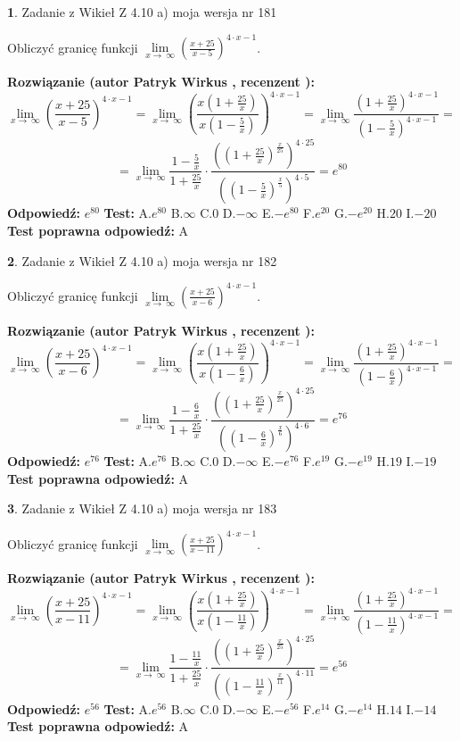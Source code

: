 \documentclass[12pt, a4paper]{article}
\theoremstyle{definition} %
\newtheorem{zad}{}
\newcommand{\zadStart}[1]{\begin{zad}#1\newline}
\newcommand{\zadStop}{\end{zad}}
\newcommand{\rozwStart}[2]{\noindent \textbf{Rozwiązanie (autor #1 , recenzent #2): }\newline}
\newcommand{\rozwStop}{\newline}
\newcommand{\odpStart}{\noindent \textbf{Odpowiedź:}\newline}
\newcommand{\odpStop}{\newline}
\newcommand{\testStart}{\noindent \textbf{Test:}\newline}
\newcommand{\testStop}{\newline}
\newcommand{\kluczStart}{\noindent \textbf{Test poprawna odpowiedź:}\newline}
\newcommand{\kluczStop}{\newline}
\begin{document}
\zadStart{Zadanie z Wikieł Z 4.10 a) moja wersja nr 181}

Obliczyć granicę funkcji  $\lim\limits_{x\to\ \infty}(\frac{x+25}{x-5})^{4\cdot x-1}$.
\zadStop
\rozwStart{Patryk Wirkus}{}
$$\lim\limits_{x\to\ \infty}(\frac{x+25}{x-5})^{4\cdot x-1} = \lim\limits_{x\to\ \infty}(\frac{x(1+\frac{25}{x})}{x(1-\frac{5}{x})})^{4\cdot x-1}=\lim\limits_{x\to\ \infty}\frac{(1+\frac{25}{x})^{4\cdot x-1}}{(1-\frac{5}{x})^{4\cdot x-1}}=$$
$$=\lim\limits_{x\to\ \infty}\frac{1-\frac{5}{x}}{1+\frac{25}{x}}\cdot\frac{((1+\frac{25}{x})^{\frac{x}{25}})^{4\cdot25}}{((1-\frac{5}{x})^{\frac{x}{5}})^{4\cdot5}}=e^{80}$$
\rozwStop
\odpStart
$e^{80}$
\odpStop
\testStart
A.$e^{80}$ B.$\infty$ C.$0$ D.$-\infty$ E.$-e^{80}$
F.$e^{20}$ G.$-e^{20}$
H.$20$
I.$-20$
\testStop
\kluczStart
A
\kluczStop



\zadStart{Zadanie z Wikieł Z 4.10 a) moja wersja nr 182}

Obliczyć granicę funkcji  $\lim\limits_{x\to\ \infty}(\frac{x+25}{x-6})^{4\cdot x-1}$.
\zadStop
\rozwStart{Patryk Wirkus}{}
$$\lim\limits_{x\to\ \infty}(\frac{x+25}{x-6})^{4\cdot x-1} = \lim\limits_{x\to\ \infty}(\frac{x(1+\frac{25}{x})}{x(1-\frac{6}{x})})^{4\cdot x-1}=\lim\limits_{x\to\ \infty}\frac{(1+\frac{25}{x})^{4\cdot x-1}}{(1-\frac{6}{x})^{4\cdot x-1}}=$$
$$=\lim\limits_{x\to\ \infty}\frac{1-\frac{6}{x}}{1+\frac{25}{x}}\cdot\frac{((1+\frac{25}{x})^{\frac{x}{25}})^{4\cdot25}}{((1-\frac{6}{x})^{\frac{x}{6}})^{4\cdot6}}=e^{76}$$
\rozwStop
\odpStart
$e^{76}$
\odpStop
\testStart
A.$e^{76}$ B.$\infty$ C.$0$ D.$-\infty$ E.$-e^{76}$
F.$e^{19}$ G.$-e^{19}$
H.$19$
I.$-19$
\testStop
\kluczStart
A
\kluczStop



\zadStart{Zadanie z Wikieł Z 4.10 a) moja wersja nr 183}

Obliczyć granicę funkcji  $\lim\limits_{x\to\ \infty}(\frac{x+25}{x-11})^{4\cdot x-1}$.
\zadStop
\rozwStart{Patryk Wirkus}{}
$$\lim\limits_{x\to\ \infty}(\frac{x+25}{x-11})^{4\cdot x-1} = \lim\limits_{x\to\ \infty}(\frac{x(1+\frac{25}{x})}{x(1-\frac{11}{x})})^{4\cdot x-1}=\lim\limits_{x\to\ \infty}\frac{(1+\frac{25}{x})^{4\cdot x-1}}{(1-\frac{11}{x})^{4\cdot x-1}}=$$
$$=\lim\limits_{x\to\ \infty}\frac{1-\frac{11}{x}}{1+\frac{25}{x}}\cdot\frac{((1+\frac{25}{x})^{\frac{x}{25}})^{4\cdot25}}{((1-\frac{11}{x})^{\frac{x}{11}})^{4\cdot11}}=e^{56}$$
\rozwStop
\odpStart
$e^{56}$
\odpStop
\testStart
A.$e^{56}$ B.$\infty$ C.$0$ D.$-\infty$ E.$-e^{56}$
F.$e^{14}$ G.$-e^{14}$
H.$14$
I.$-14$
\testStop
\kluczStart
A
\kluczStop
\end{document}
